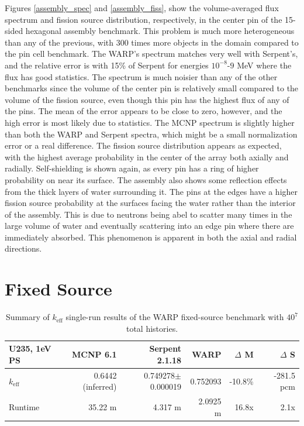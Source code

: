Figures \ref{assembly_spec} and \ref{assembly_fiss}, show the volume-averaged flux spectrum and fission source distribution, respectively, in the center pin of the 15-sided hexagonal assembly benchmark.  This problem is much more heterogeneous than any of the previous, with 300 times more objects in the domain compared to the pin cell benchmark.  The WARP's spectrum matches very well with Serpent's, and the relative error is with 15\% of Serpent  for energies $10^{-8}$-$9$ MeV where the flux has good statistics.  The spectrum is much noisier than any of the other benchmarks since the volume of the center pin is relatively small compared to the volume of the fission source, even though this pin has the highest flux of any of the pins.  The mean of the error appears to be close to zero, however, and the high error is most likely due to statistics.  The MCNP spectrum is slightly higher than both the WARP and Serpent spectra, which might be a small normalization error or a real difference.  The fission source distribution appears as expected, with the highest average probability in the center of the array both axially and radially.  Self-shielding is shown again, as every pin has a ring of higher probability on near its surface.  The assembly also shows some reflection effects from the thick layers of water surrounding it.  The pins at the edges have a higher fission source probability at the surfaces facing the water rather than the interior of the assembly.  This is due to neutrons being abel to scatter many times in the large volume of water and eventually scattering into an edge pin where there are immediately absorbed.  This phenomenon is apparent in both the axial and radial directions.


\section{Fixed Source}

\begin{table}[h]
\centering
\caption{Summary of $k_\mathrm{eff}$ single-run results of the WARP fixed-source benchmark with $40^7$ total histories.}
\label{fixed_summary}
\begin{tabular}{| l | r | r | r | r | r |}
 \hline
  U235, 1eV PS & MCNP 6.1 & Serpent 2.1.18 & WARP & $\Delta$ M & $\Delta$ S  \\
\hline
\hline
 $k_\mathrm{eff}$ & 0.6442 (inferred) & 0.749278$\pm$0.000019 & 0.752093 & -10.8\%  & -281.5 pcm   \\
 \hline
 Runtime               & 35.22 m & 4.317 m &  2.0925 m & 16.8x  & 2.1x  \\
 \hline
\end{tabular}
\end{table}

